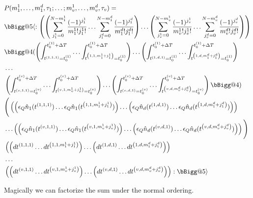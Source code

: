 \documentclass[12pt]{article}
\makeatletter
\newcommand{\ep}{\epsilon}
\newcommand{\vast}{\bBigg@{4}}
\newcommand{\Vast}{\bBigg@{5}}
\makeatother
\begin{document}
\begin{align}
&P(m_1^1,\ldots,m_1^d,\tau_1; \ldots ; m_v^1, \ldots, m_v^d, \tau_v) =\\
&\Vast\langle: \left(\left(\sum_{j_1^1=0}^{N-m_1^1}\frac{(-1)^{j_1^1}}{m_1^1!j_1^1!} 
\ldots \sum_{j_1^d=0}^{N-m_1^d}\frac{(-1)^{j_1^d}}{m_1^d!j_1^d!} \right) 
\ldots
\left(\sum_{j_v^1=0}^{N-m_v^1}\frac{(-1)^{j_v^1}}{m_v^1!j_v^1!} 
\ldots \sum_{j_v^d=0}^{N-m_v^d}\frac{(-1)^{j_v^d}}{m_v^d!j_v^d!} \right) \right)\\
&\vast(\left(\int_{t^{(1,1,1)} = t^{(1)}_0}^{t_0^{(1)}+\Delta T} \ldots \int_{t^{\left(1,1,m_1^1+j_1^1\right)} = t^{(1)}_0}^{t_0^{(1)}+\Delta T}\right) \ldots \left(\int_{t^{(1,d,1)} = t^{(1)}_0}^{t_0^{(1)}+\Delta T} \ldots \int_{t^{\left(1,d,m_1^d+j_1^d\right)} = t^{(1)}_0}^{t_0^{(1)}+\Delta T}\right)\\
&\ldots\\
&\left(\int_{t^{(v,1,1)} = t^{(v)}_0}^{t_0^{(v)}+\Delta T} \ldots \int_{t^{\left(v,1,m_v^1+j_v^1\right)} = t^{(v)}_0}^{t_0^{(v)}+\Delta T}\right) \ldots \left(\int_{t^{(v,d,1)} = t^{(v)}_0}^{t_0^{(v)}+\Delta T} \ldots \int_{t^{\left(v,d, m_v^d+j_v^d\right)} = t^{(v)}_0}^{t_0^{(v)}+\Delta T}\right)\vast)\\
&\Bigg(\left(\left(\ep_Q\hat{n}_1(t^{(1,1,1)})\ldots \ep_Q\hat{n}_1(t^{\left(1,1,m_1^1+j_1^1\right)})\right) \ldots \left(\ep_Q\hat{n}_d(t^{(1,d,1)})\ldots \ep_Q\hat{n}_d(t^{\left(1,d,m_1^d+j_1^d\right)})\right)\right)\\
&\ldots \left(\left(\ep_Q \hat{n}_1(t^{(v,1,1)})\ldots \ep_Q\hat{n}_1(t^{\left(v,1,m_v^1+j_v^1\right)})\right) \ldots \left(\ep_Q\hat{n}_d(t^{\left(v,d,1\right)})\ldots \ep_Q\hat{n}_d(t^{\left(v,d,m_v^d+j_v^d\right)})\right)\right)\Bigg)\\
&\left( \left(dt^{(1,1,1)} \ldots dt^{\left(1,1,m_1^1+j_1^1\right)}\right) \ldots \left(dt^{(1,d,1)} \ldots dt^{\left(1,d,m_1^d+j_1^d\right)}\right) \right)\\
&\ldots\\
&\left( \left(dt^{(v,1,1)} \ldots dt^{\left(v,1,m_v^1+j_v^1\right)}\right) \ldots \left(dt^{(v,d,1)} \ldots dt^{\left(v,d,m_v^d+j_v^d\right)}\right) \right):\Vast\rangle\\
\end{align}	

Magically we can factorize the sum under the normal ordering.
\end{document}
